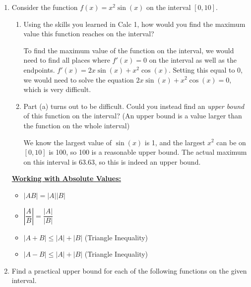 \documentclass[main]{subfiles}
\begin{document}
\begin{enumerate}
\item Consider the function $f(x)=x^2\sin(x)$ on the interval $[0,10]$.

\begin{enumerate}
    \item \begin{problem}[\vfill]Using the skills you learned in Calc 1, how would you find the maximum value this function reaches on the interval?
    \end{problem}

    \begin{solution}
        To find the maximum value of the function on the interval, we would need to find all places where $f'(x)=0$ on the interval as well as the endpoints. $f'(x)=2x\sin(x)+x^2\cos(x)$. Setting this equal to 0, we would need to solve the equation $2x\sin(x)+x^2\cos(x)=0$, which is very difficult.
    \end{solution}
    \item \begin{problem}[\vfill]
        Part (a) turns out to be difficult. Could you instead find an \textit{upper bound} of this function on the interval? (An upper bound is a value larger than the function on the whole interval)
    \end{problem}

    \begin{solution}
        We know the largest value of $\sin(x)$ is 1, and the largest $x^2$ can be on $[0,10]$ is 100, so 100 is a reasonable upper bound. The actual maximum on this interval is 63.63, so this is indeed an upper bound.
    \end{solution}
\end{enumerate}
\pspace{\newpage}
\begin{framed}
    \textbf{\underline{Working with Absolute Values:}}\begin{itemize}
        \item $|AB|=|A||B|$
        \item $\left|\dfrac{A}{B}\right|=\dfrac{|A|}{|B|}$
        \item $|A+B|\leq |A|+|B|$   (Triangle Inequality)
        \item $|A-B|\leq |A|+|B|$   (Triangle Inequality)
    \end{itemize} 
\end{framed}
\item 
\begin{problem}
Find a practical upper bound for each of the following functions on the given interval.
\end{problem}


\end{enumerate}
\end{document}

